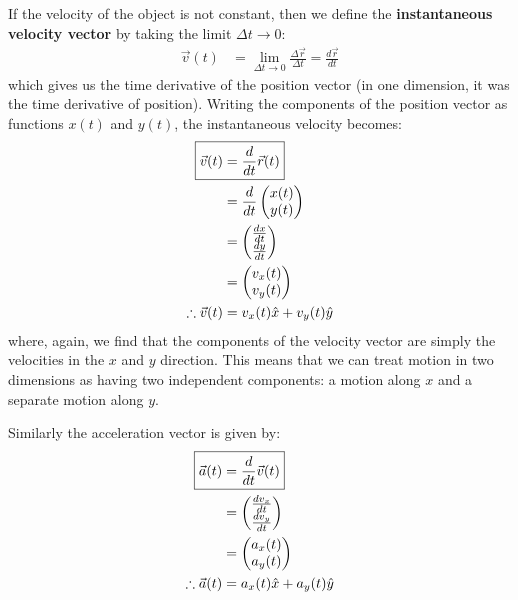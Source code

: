If the velocity of the object is not constant, then we define the \textbf{instantaneous velocity vector} by taking the limit $\Delta t\to 0$:
\begin{align}
\vec v(t) &= \lim_{\Delta t \to 0}\frac{\Delta \vec r}{\Delta t}=\frac{d\vec r}{dt}
\end{align}
which gives us the time derivative of the position vector (in one dimension, it was the time derivative of position). Writing the components of the position vector as functions $x(t)$ and $y(t)$, the instantaneous velocity becomes:
\begin{align}
\label{eqn:chap4:vvecdef}
\Aboxed{\vec v(t) &=\frac{d}{dt}\vec r(t) }\\
&=\frac{d}{dt} \begin{pmatrix}
           x(t) \\
           y(t) \\
         \end{pmatrix}\nonumber\\ 
&=\begin{pmatrix}
           \frac{dx}{dt}  \\
          \frac{dy}{dt}  \\
         \end{pmatrix}\nonumber\\ 
 &=\begin{pmatrix}
           v_x(t) \\
           v_y(t) \\
         \end{pmatrix}\nonumber\\   
\therefore \vec v(t) &= v_x(t)\hat x+v_y(t)\hat y  \nonumber     
\end{align}
where, again, we find that the components of the velocity vector are simply the velocities in the $x$ and $y$ direction. This means that we can treat motion in two dimensions as having two independent components: a motion along $x$ and a separate motion along $y$.

Similarly the acceleration vector is given by:
\begin{align}
\label{eqn:chap4:avecdef}
\Aboxed{\vec a(t) &= \frac{d}{dt}\vec v(t)} \\
&=\begin{pmatrix}
           \frac{dv_x}{dt}  \\
          \frac{dv_y}{dt}  \\
         \end{pmatrix}\nonumber\\
&=\begin{pmatrix}
           a_x(t) \\
           a_y(t) \\
         \end{pmatrix}\nonumber\\
\therefore \vec a(t) &= a_x(t)\hat x+a_y(t)\hat y      \nonumber        
\end{align}

